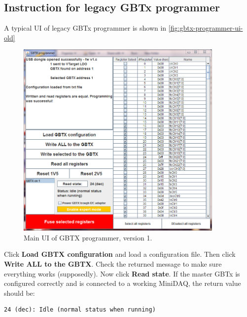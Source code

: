 \subsection{Instruction for legacy GBTx programmer}
\label{appx:legacy-gbtx-programmer}

A typical UI of legacy GBTx programmer is shown in
\autoref{fig:gbtx-programmer-ui-old}

\begin{figure}[!ht]
	\centering
	\includegraphics[width=0.9\textwidth]{res/gbtx_programmer_v1_ui.png}
	\caption{Main UI of GBTX programmer, version 1.}
	\label{fig:gbtx-programmer-ui-old}
\end{figure}

Click \textbf{Load GBTX configuration} and load a configuration file.
Then click \textbf{Write ALL to the GBTX}. Check the returned message to make
sure everything works (supposedly).
Now click \textbf{Read state}.
If the master GBTx is configured correctly and is connected to a working
MiniDAQ, the return value should be:

\begin{lstlisting}
24 (dec): Idle (normal status when running)
\end{lstlisting}
